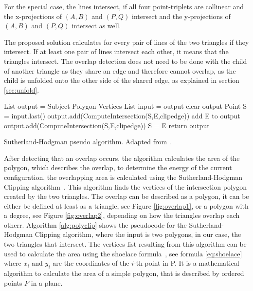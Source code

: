 \documentclass[draft,final]{vutinfth} %
\begin{document}
For the special case, the lines intersect, if all four point-triplets are collinear and the x-projections of $(A,B)$ and $(P,Q)$ intersect and the y-projections of $(A,B)$ and $(P,Q)$ intersect as well.

The proposed solution calculates for every pair of lines of the two triangles if they intersect. If at least one pair of lines intersect each other, it means that the triangles intersect. The overlap detection does not need to be done with the child of another triangle as they share an edge and therefore cannot overlap, as the child is unfolded onto the other side of the shared edge, as explained in section \ref{sec:unfold}.

\begin{algorithm}
List output = Subject Polygon Vertices\;
{
List input = output\;
clear output\;
Point S = input.last()\;
{
{
{
output.add(ComputeIntersection(S,E,clipedge))\;
}
add E to output\;
}
{
{
output.add(ComputeIntersection(S,E,clipedge))\;
}
S = E\;
}
}
}
return output\;
\caption{Sutherland-Hodgman pseudo algorithm. Adapted from \cite{wiki:polygonclip}.}
\label{alg:polyclip}
\end{algorithm}

After detecting that an overlap occurs, the algorithm calculates the area of the polygon, which describes the overlap, to determine the energy of the current configuration, the overlapping area is calculated using the Sutherland-Hodgman Clipping algorithm~\cite{sutherland1974reentrant}. This algorithm finds the vertices of the intersection polygon created by the two triangles. The overlap can be described as a polygon, it can be either be defined at least as a triangle, see Figure \ref{fig:overlap1}, or a polygon with a degree, see Figure \ref{fig:overlap2}, depending on how the triangles overlap each otherr. Algorithm \ref{alg:polyclip} shows the pseudocode for the Sutherland-Hodgman Clipping algorithm, where the input is two polygons, in our case, the two triangles that intersect. The vertices list resulting from this algorithm can be used to calculate the area using the shoelace formula~\cite{vslapak2017automated}, see formula \ref{eq:shoelace} where $x_i$ and $y_i$ are the coordinates of the $i$-th point in P. It is a mathematical algorithm to calculate the area of a simple polygon, that is described by ordered points $P$ in a plane.
\end{document}
